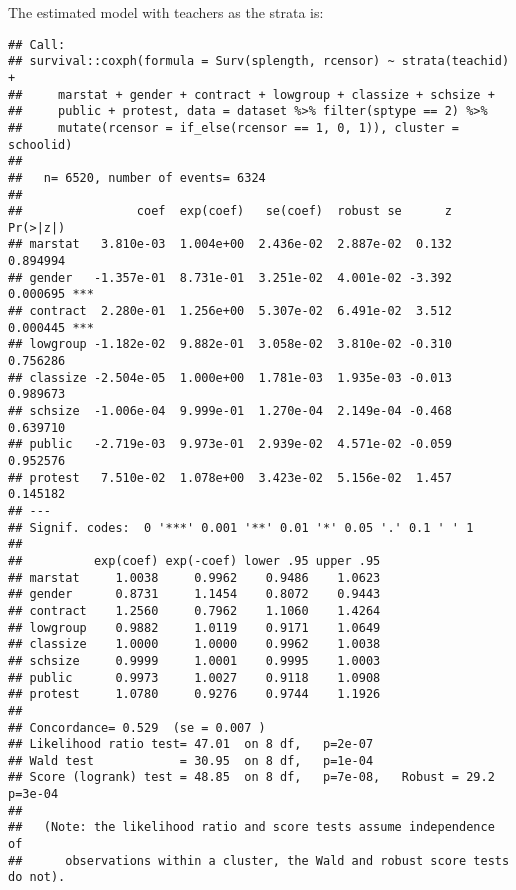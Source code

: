 \documentclass[
]{article}
\begin{document}
The estimated model with teachers as the strata is:

\begin{verbatim}
## Call:
## survival::coxph(formula = Surv(splength, rcensor) ~ strata(teachid) + 
##     marstat + gender + contract + lowgroup + classize + schsize + 
##     public + protest, data = dataset %>% filter(sptype == 2) %>% 
##     mutate(rcensor = if_else(rcensor == 1, 0, 1)), cluster = schoolid)
## 
##   n= 6520, number of events= 6324 
## 
##                coef  exp(coef)   se(coef)  robust se      z Pr(>|z|)    
## marstat   3.810e-03  1.004e+00  2.436e-02  2.887e-02  0.132 0.894994    
## gender   -1.357e-01  8.731e-01  3.251e-02  4.001e-02 -3.392 0.000695 ***
## contract  2.280e-01  1.256e+00  5.307e-02  6.491e-02  3.512 0.000445 ***
## lowgroup -1.182e-02  9.882e-01  3.058e-02  3.810e-02 -0.310 0.756286    
## classize -2.504e-05  1.000e+00  1.781e-03  1.935e-03 -0.013 0.989673    
## schsize  -1.006e-04  9.999e-01  1.270e-04  2.149e-04 -0.468 0.639710    
## public   -2.719e-03  9.973e-01  2.939e-02  4.571e-02 -0.059 0.952576    
## protest   7.510e-02  1.078e+00  3.423e-02  5.156e-02  1.457 0.145182    
## ---
## Signif. codes:  0 '***' 0.001 '**' 0.01 '*' 0.05 '.' 0.1 ' ' 1
## 
##          exp(coef) exp(-coef) lower .95 upper .95
## marstat     1.0038     0.9962    0.9486    1.0623
## gender      0.8731     1.1454    0.8072    0.9443
## contract    1.2560     0.7962    1.1060    1.4264
## lowgroup    0.9882     1.0119    0.9171    1.0649
## classize    1.0000     1.0000    0.9962    1.0038
## schsize     0.9999     1.0001    0.9995    1.0003
## public      0.9973     1.0027    0.9118    1.0908
## protest     1.0780     0.9276    0.9744    1.1926
## 
## Concordance= 0.529  (se = 0.007 )
## Likelihood ratio test= 47.01  on 8 df,   p=2e-07
## Wald test            = 30.95  on 8 df,   p=1e-04
## Score (logrank) test = 48.85  on 8 df,   p=7e-08,   Robust = 29.2  p=3e-04
## 
##   (Note: the likelihood ratio and score tests assume independence of
##      observations within a cluster, the Wald and robust score tests do not).
\end{verbatim}
\end{document}
